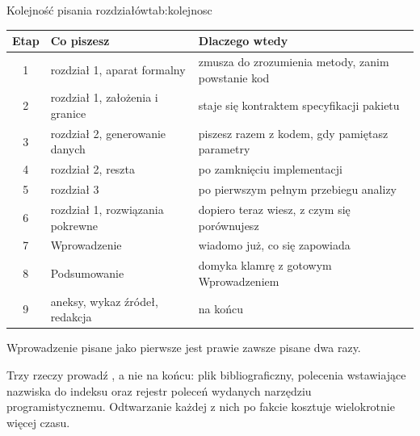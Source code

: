 \begin{tabelaepi}{Kolejność pisania rozdziałów}{tab:kolejnosc}
\begin{tabular}{@{}clp{7cm}@{}}
\toprule
Etap & Co piszesz & Dlaczego wtedy \\
\midrule
1 & rozdział 1, aparat formalny & zmusza do zrozumienia metody, zanim powstanie kod \\
2 & rozdział 1, założenia i granice & staje się kontraktem specyfikacji pakietu \\
3 & rozdział 2, generowanie danych & piszesz razem z kodem, gdy pamiętasz parametry \\
4 & rozdział 2, reszta & po zamknięciu implementacji \\
5 & rozdział 3 & po pierwszym pełnym przebiegu analizy \\
6 & rozdział 1, rozwiązania pokrewne & dopiero teraz wiesz, z czym się porównujesz \\
7 & Wprowadzenie & wiadomo już, co się zapowiada \\
8 & Podsumowanie & domyka klamrę z gotowym Wprowadzeniem \\
9 & aneksy, wykaz źródeł, redakcja & na końcu \\
\bottomrule
\end{tabular}
\end{tabelaepi}

Wprowadzenie pisane jako pierwsze jest prawie zawsze pisane dwa razy.

Trzy rzeczy prowadź , a nie na końcu: plik bibliograficzny, polecenia wstawiające nazwiska do indeksu oraz rejestr poleceń wydanych narzędziu programistycznemu. Odtwarzanie każdej z nich po fakcie kosztuje wielokrotnie więcej czasu.
